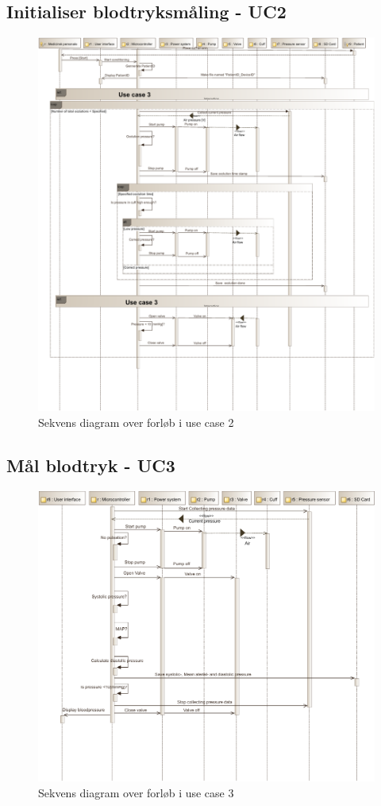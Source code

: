 \subsection{Initialiser blodtryksmåling - UC2}
\begin{figure}[H]
\includegraphics[width=\textwidth]{pdfs/SD_UC2-crop.pdf}
\caption{Sekvens diagram over forløb i use case 2}
\end{figure}
\newpage

\subsection{Mål blodtryk - UC3}
\begin{figure}[H]
\includegraphics[width=\textwidth]{pdfs/SD_UC3-crop.pdf}
\caption{Sekvens diagram over forløb i use case 3}
\end{figure}
\newpage

